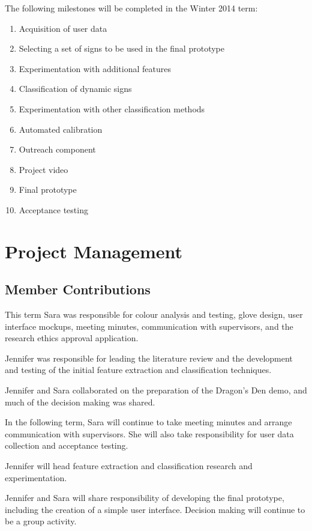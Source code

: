 \documentclass[12pt]{article}
\begin{document}
The following milestones will be completed in the Winter 2014 term:
\begin{enumerate}
  \item Acquisition of user data
  \item Selecting a set of signs to be used in the final prototype
  \item Experimentation with additional features
  \item Classification of dynamic signs
  \item Experimentation with other classification methods
  \item Automated calibration 
  \item Outreach component
  \item Project video
  \item Final prototype
  \item Acceptance testing
\end{enumerate}

\newpage
\section{Project Management}
\subsection{Member Contributions}
\label{subsec:member}
This term Sara was responsible for colour analysis and testing, glove design, user interface mockups, meeting minutes, communication with supervisors, and the research ethics approval application. 

Jennifer was responsible for leading the literature review and the development and testing of the initial feature extraction and classification techniques. 

Jennifer and Sara collaborated on the preparation of the Dragon’s Den demo, and much of the decision making was shared.

In the following term, Sara will continue to take meeting minutes and arrange communication with supervisors. She will also take responsibility for user data collection and acceptance testing. 

Jennifer will head feature extraction and classification research and experimentation. 

Jennifer and Sara will share responsibility of developing the final prototype, including the creation of a simple user interface. Decision making will continue to be a group activity. 
\end{document}
